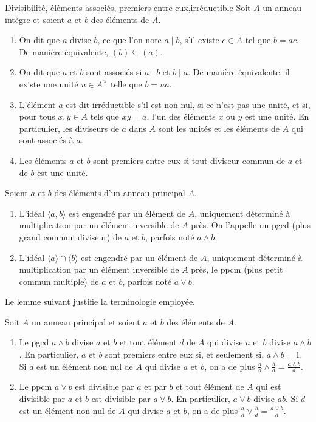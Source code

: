 \documentclass[]{report}
\begin{document}
\begin{df}{Divisibilité, éléments associés, premiers entre eux,irréductible}{}
    Soit $A$ un anneau intègre et soient $a$ et $b$ des éléments de $A$.
    \begin{enumerate}
        \item On dit que $a$ divise $b$, ce que l'on note $a \mid b$, s'il existe $c \in A$ tel que $b = ac$. De manière équivalente, $(b) \subseteq (a)$.
        \item On dit que $a$ et $b$ sont associés si $a \mid b$ et $b \mid a$. De manière équivalente, il existe une unité $u \in A^{\times}$ telle que $b = ua$.
        \item L'élément $a$ est dit irréductible s'il est non nul, si ce n'est pas une unité, et si, pour tous $x, y \in A$ tels que $xy = a$, l'un des éléments $x$ ou $y$ est une unité. En particulier, les diviseurs de $a$ dans $A$ sont les unités et les éléments de $A$ qui sont associés à $a$.
        \item Les éléments $a$ et $b$ sont premiers entre eux si tout diviseur commun de $a$ et de $b$ est une unité.
    \end{enumerate}
\end{df}

\begin{df}{}{}
    Soient $a$ et $b$ des éléments d'un anneau principal $A$.
    \begin{enumerate}
        \item L'idéal $\langle a, b \rangle$ est engendré par un élément de $A$, uniquement déterminé à multiplication par un élément inversible de $A$ près. On l'appelle un pgcd (plus grand commun diviseur) de $a$ et $b$, parfois noté $a \wedge b$.
        \item L'idéal $\langle a \rangle \cap \langle b \rangle$ est engendré par un élément de $A$, uniquement déterminé à multiplication par un élément inversible de $A$ près, le ppcm (plus petit commun multiple) de $a$ et $b$, parfois noté $a \vee b$.
    \end{enumerate}
\end{df}

Le lemme suivant justifie la terminologie employée.

\begin{prop}{}{}
    Soit $A$ un anneau principal et soient $a$ et $b$ des éléments de $A$.
    \begin{enumerate}
        \item Le pgcd $a \wedge b$ divise $a$ et $b$ et tout élément $d$ de $A$ qui divise $a$ et $b$ divise $a \wedge b$. En particulier, $a$ et $b$ sont premiers entre eux si, et seulement si, $a \wedge b = 1$. Si $d$ est un élément non nul de $A$ qui divise $a$ et $b$, on a de plus $\frac{a}{d} \wedge \frac{b}{d} = \frac{a \wedge b}{d}$.
        \item Le ppcm $a \vee b$ est divisible par $a$ et par $b$ et tout élément de $A$ qui est divisible par $a$ et $b$ est divisible par $a \vee b$. En particulier, $a \vee b$ divise $ab$. Si $d$ est un élément non nul de $A$ qui divise $a$ et $b$, on a de plus $\frac{a}{d} \vee \frac{b}{d} = \frac{a \vee b}{d}$.
    \end{enumerate}
\end{prop}
\end{document}
